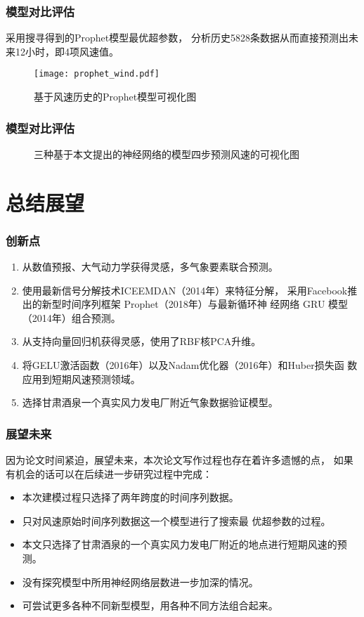 \documentclass[14pt, AutoFakeBold]{ppt}
\begin{document}
\begin{frame}
  \frametitle{模型对比评估}
  采用搜寻得到的Prophet模型最优超参数，
  分析历史5828条数据从而直接预测出未来12小时，即4项风速值。
  \begin{figure}[H]
    \centering
      \texttt{[image: prophet\_wind.pdf]}
      \caption{基于风速历史的Prophet模型可视化图}
      \label{fig_prophet_wind}
  \end{figure}
\end{frame}

\begin{frame}
  \frametitle{模型对比评估}
  \begin{figure}[H]
    \centering
    \caption{三种基于本文提出的神经网络的模型四步预测风速的可视化图}
    \label{fig_gru_predict_test}
  \end{figure}
\end{frame}

\section{总结展望}

\begin{frame}
  \frametitle{创新点}
  \begin{enumerate}
    \item 从数值预报、大气动力学获得灵感，多气象要素联合预测。
    \item 使用最新信号分解技术ICEEMDAN（2014年）来特征分解，
    采用Facebook推出的新型时间序列框架 Prophet（2018年）与最新循环神
    经网络 GRU 模型（2014年）组合预测。
    \item 从支持向量回归机获得灵感，使用了RBF核PCA升维。
    \item 将GELU激活函数（2016年）以及Nadam优化器（2016年）和Huber损失函
    数应用到短期风速预测领域。
    \item 选择甘肃酒泉一个真实风力发电厂附近气象数据验证模型。
  \end{enumerate}
\end{frame}

\begin{frame}
  \frametitle{展望未来}
  因为论文时间紧迫，展望未来，本次论文写作过程也存在着许多遗憾的点，
  如果有机会的话可以在后续进一步研究过程中完成：
  \begin{itemize}
    \item 本次建模过程只选择了两年跨度的时间序列数据。
    \item 只对风速原始时间序列数据这一个模型进行了搜索最
    优超参数的过程。
    \item 本文只选择了甘肃酒泉的一个真实风力发电厂附近的地点进行短期风速的预测。
    \item 没有探究模型中所用神经网络层数进一步加深的情况。
    \item 可尝试更多各种不同新型模型，用各种不同方法组合起来。
  \end{itemize}
\end{frame}
\end{document}
